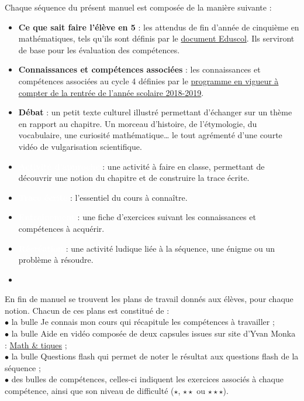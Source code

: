 Chaque séquence du présent manuel est composée de la manière suivante : \\
\begin{itemize}
   \item \colorbox{J4}{\textcolor{B2}{\sffamily\bfseries Ce que sait faire l'élève en 5}} : les attendus de fin d'année de cinquième en mathématiques, tels qu'ils sont définis par le \href{https://eduscol.education.fr/document/14044/download}{document Eduscol}. Ils serviront de base pour les évaluation des compétences. \medskip
   \item \textcolor{B2}{\sffamily\bfseries Connaissances et compétences associées} : les connaissances et compétences associées au cycle 4 définies par le \href{https://cache.media.eduscol.education.fr/file/A-Scolarite_obligatoire/37/5/Programme2020_cycle_3_comparatif_1313375.pdf}{programme en vigueur à compter de la rentrée de l'année scolaire 2018-2019}. \medskip
   \item \textcolor{B1}{\sffamily\bfseries Débat} : un petit texte culturel illustré permettant d'échanger sur un thème en rapport au chapitre. Un morceau d'histoire, de l'étymologie, du vocabulaire, une curiosité mathématique\dots{} le tout agrémenté d'une courte vidéo de vulgarisation scientifique. \medskip
   \item \colorbox{A2}{\textcolor{white}{\sffamily\bfseries Activité d'approche}} : une activité à faire en classe, permettant de découvrir une notion du chapitre et de construire la trace écrite. \medskip
   \item \colorbox{A1}{\textcolor{white}{\sffamily\bfseries Trace écrite}} : l'essentiel du cours à connaître. \medskip
   \item \colorbox{B1}{\textcolor{white}{\sffamily\bfseries Entraînement}} : une fiche d'exercices suivant les connaissances et compétences à acquérir. \medskip
   \item \colorbox{B2}{\textcolor{white}{\sffamily\bfseries Récréation}} : une activité ludique liée à la séquence, une énigme ou un problème à résoudre.
   \item
\end{itemize}

\bigskip

En fin de manuel se trouvent les plans de travail donnés aux élèves, pour chaque notion. Chacun de ces plans est constitué de : \\
   $\bullet$ la bulle \og Je connais mon cours \fg{} qui récapitule les compétences à travailler ; \\
   $\bullet$ la bulle \og Aide en vidéo \fg{} composée de deux capsules issues sur site d'Yvan Monka : \href{https://www.maths-et-tiques.fr}{Math \& tiques} ; \\
   $\bullet$ la bulle \og Questions flash \fg{} qui permet de noter le résultat aux questions flash de la séquence ; \\
   $\bullet$ des bulles de compétences, celles-ci indiquent les exercices associés à chaque compétence, ainsi que son niveau de difficulté ($\star$, $\star\star$ ou $\star\star\star$).
   
